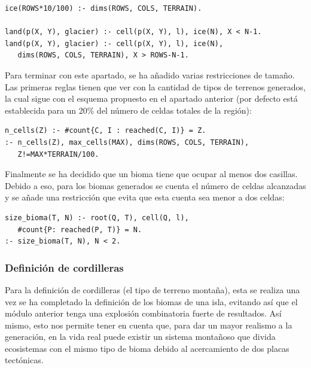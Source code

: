 \begin{lstlisting}[label=lst:glaciers]
ice(ROWS*10/100) :- dims(ROWS, COLS, TERRAIN).

land(p(X, Y), glacier) :- cell(p(X, Y), l), ice(N), X < N-1.
land(p(X, Y), glacier) :- cell(p(X, Y), l), ice(N),
   dims(ROWS, COLS, TERRAIN), X > ROWS-N-1.
\end{lstlisting}

\hspace{1em}

Para terminar con este apartado, se ha añadido varias restricciones de tamaño. Las primeras reglas tienen que ver con la cantidad de tipos de terrenos generados, la cual sigue con el esquema propuesto en el apartado anterior (por defecto está establecida para un 20\% del número de celdas totales de la región): \\

\begin{lstlisting}[label=lst:tmax]
n_cells(Z) :- #count{C, I : reached(C, I)} = Z.
:- n_cells(Z), max_cells(MAX), dims(ROWS, COLS, TERRAIN),
   Z!=MAX*TERRAIN/100.
\end{lstlisting}

\hspace{1em}

Finalmente se ha decidido que un bioma tiene que ocupar al menos dos casillas. Debido a eso, para los biomas generados se cuenta el número de celdas alcanzadas y se añade una restricción que evita que esta cuenta sea menor a dos celdas: \\

\begin{lstlisting}[label=lst:tmax]
size_bioma(T, N) :- root(Q, T), cell(Q, l), 
   #count{P: reached(P, T)} = N.
:- size_bioma(T, N), N < 2.
\end{lstlisting}

\subsubsection{Definición de cordilleras}

Para la definición de cordilleras (el tipo de terreno montaña), esta se realiza una vez se ha completado la definición de los biomas de una isla, evitando así que el módulo anterior tenga una explosión combinatoria fuerte de resultados. Así mismo, esto nos permite tener en cuenta que, para dar un mayor realismo a la generación, en la vida real puede existir un sistema montañoso que divida ecosistemas con el mismo tipo de bioma debido al acercamiento de dos placas tectónicas. \\

